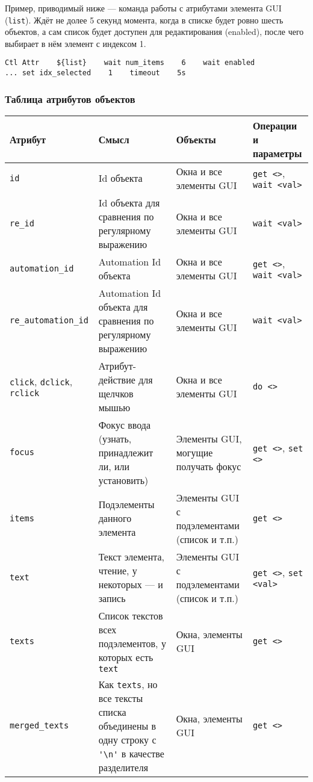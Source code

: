 \documentclass[11pt]{book} %
\begin{document}
Пример, приводимый ниже --- команда работы с атрибутами элемента GUI (\verb|list|). Ждёт не долее 5 секунд момента, когда в списке будет ровно шесть объектов, а сам список будет доступен для редактирования (enabled), после чего выбирает в нём элемент с индексом 1.
\begin{verbatim}
Ctl Attr    ${list}    wait num_items    6    wait enabled 
... set idx_selected    1    timeout    5s
\end{verbatim}


\subsubsection{Таблица атрибутов объектов}

\begin{center}
	\begin{tabular}{|p{90pt}|p{120pt}|p{100pt}|p{60pt}|}\hline
		\textbf{Атрибут} & \textbf{Смысл} & \textbf{Объекты} & \textbf{Операции и параметры} \\ \hline
		\verb|id| & Id объекта & Окна и все элементы GUI & \verb|get <>|, \verb|wait <val>| \\ \hline
		\verb|re_id| & Id объекта для сравнения по регулярному выражению & Окна и все элементы GUI & \verb|wait <val>| \\ \hline
		\verb|automation_id| & Automation Id объекта & Окна и все элементы GUI & \verb|get <>|, \verb|wait <val>| \\ \hline
		\verb|re_automation_id| & Automation Id объекта для сравнения по регулярному выражению & Окна и все элементы GUI & \verb|wait <val>| \\ \hline
		\verb|click|, \verb|dclick|, \verb|rclick| & Атрибут-действие для щелчков мышью & Окна и все элементы GUI & \verb|do <>| \\ \hline
		\verb|focus| & Фокус ввода (узнать, принадлежит ли, или установить) & Элементы GUI, могущие получать фокус & \verb|get <>|, \verb|set <>|  \\ \hline		
		\verb|items| & Подэлементы данного элемента & Элементы GUI с подэлементами (список и т.п.) & \verb|get <>| \\ \hline				
		\verb|text| & Текст элемента, чтение, у некоторых --- и запись & Элементы GUI с подэлементами (список и т.п.) & \verb|get <>|, \verb|set <val>| \\ \hline				
		\verb|texts| & Список текстов всех подэлементов, у которых есть \verb|text| & Окна, элементы GUI & \verb|get <>| \\ \hline
		\verb|merged_texts| & Как \verb|texts|, но все тексты списка объединены в одну строку с \verb"'\n'" в качестве разделителя & Окна, элементы GUI & \verb|get <>| \\ \hline

\end{tabular}
\end{center}
\end{document}
